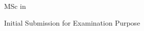 \begin{titlepage}
\centering
\vspace*{12mm}
{\Large\bfseries\MakeUppercase{\disstitle}\par}
\vfill
{\large\studentname\par}
\vspace{12mm}
{\large MSc in \degreefield\par}
\vspace{12mm}
{\large \universityname\par}
\vspace{12mm}
{\large\awardyear\par}
\vfill
{\large Initial Submission for Examination Purpose\par}
\end{titlepage}
